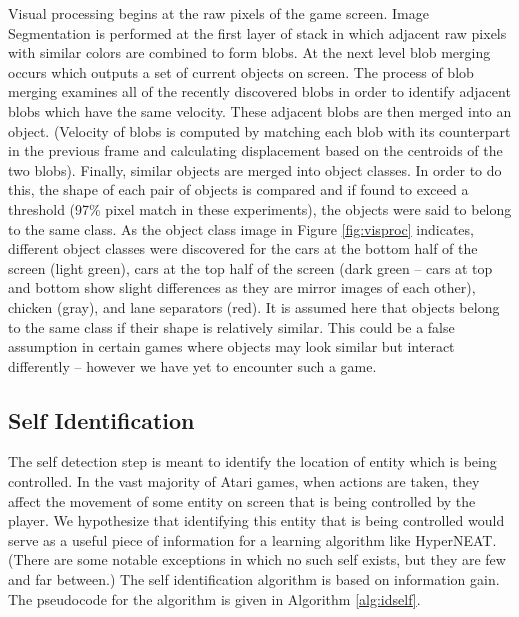 \documentclass{article}
\begin{document}
Visual processing begins at the raw pixels of the game screen. Image Segmentation is performed at the first layer of stack in which adjacent raw pixels with similar colors are combined to form blobs. At the next level blob merging occurs which outputs a set of current objects on screen. The process of blob merging examines all of the recently discovered blobs in order to identify adjacent blobs which have the same velocity. These adjacent blobs are then merged into an object. (Velocity of blobs is computed by matching each blob with its counterpart in the previous frame and calculating displacement based on the centroids of the two blobs). Finally, similar objects are merged into object classes. In order to do this, the shape of each pair of objects is compared and if found to exceed a threshold (97\% pixel match in these experiments), the objects were said to belong to the same class. As the object class image in Figure \ref{fig:visproc} indicates, different object classes were discovered for the cars at the bottom half of the screen (light green), cars at the top half of the screen (dark green -- cars at top and bottom show slight differences as they are mirror images of each other), chicken (gray), and lane separators (red). It is assumed here that objects belong to the same class if their shape is relatively similar. This could be a false assumption in certain games where objects may look similar but interact differently -- however we have yet to encounter such a game.

\subsection{Self Identification}
The self detection step is meant to identify the location of entity which is being controlled. In the vast majority of Atari games, when actions are taken, they affect the movement of some entity on screen that is being controlled by the player. We hypothesize that identifying this entity that is being controlled would serve as a useful piece of information for a learning algorithm like HyperNEAT. (There are some notable exceptions in which no such self exists, but they are few and far between.) The self identification algorithm is based on information gain. The pseudocode for the algorithm is given in Algorithm \ref{alg:idself}.
\end{document}

